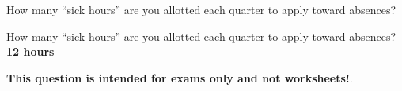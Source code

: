 

How many ``sick hours'' are you allotted each quarter to apply toward absences?







How many ``sick hours'' are you allotted each quarter to apply toward absences? {\bf 12 hours}







{\bf This question is intended for exams only and not worksheets!}.



